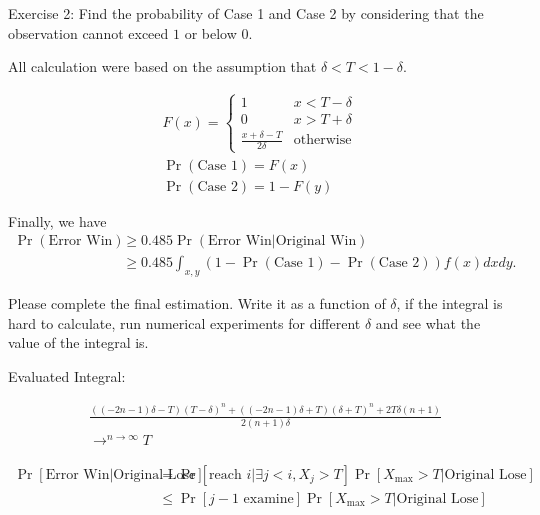 {\color{red} Exercise 2: Find the probability of Case 1 and Case 2 by considering that the observation cannot exceed $1$ or below $0$.}

All calculation were based on the assumption that $\delta < T < 1-\delta$.

\begin{gather*}
    F(x) = \begin{cases}
    1 & x<T-\delta \\
    0 & x>T+\delta \\
    \frac{x+\delta-T}{2\delta} & \text{otherwise}
    \end{cases} \\
    \Pr(\text{Case 1}) = F(x)\\
    \Pr(\text{Case 2}) = 1-F(y)
\end{gather*}

Finally, we have 
\begin{align*}
    \Pr(\text{Error Win}) &\geq  0.485 \Pr(\text{Error Win} \vert \text{Original Win}) \\&\geq 0.485 \int_{x,y} (1-\Pr(\text{Case 1})-\Pr(\text{Case 2}))f(x)dxdy.
\end{align*}

{\color{red} Please complete the final estimation. Write it as a function of $\delta$, if the integral is hard to calculate, run numerical experiments for different $\delta$ and see what the value of the integral is.}


{\color{blue} Evaluated Integral:}

\begin{align*}
&\frac{\left(\left(-2 n -1\right) \delta -T \right) \left(T -\delta \right)^{n}+\left(\left(-2 n -1\right) \delta +T \right) \left(\delta +T \right)^{n}+2 T \delta \left(n +1\right)}{2 \left(n +1\right) \delta} \\
&\longrightarrow^{n\to\infty}{T}
\end{align*}
    
    
\begin{align*}
    \operatorname{Pr}\left[{\text{Error Win} | \text{Original Lose}}\right]
&=\operatorname{Pr}\left[{\text{reach }i | \exists j<i, X_j > T}\right] \operatorname{Pr}\left[{X_{\max} > T | \text{Original Lose}}\right]\\
&\leq \operatorname{Pr}\left[{j-1 \text{ examine}}\right] \operatorname{Pr}\left[{X_{\max} > T | \text{Original Lose}}\right]
\end{align*}
